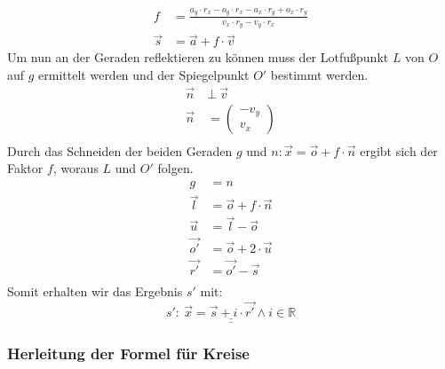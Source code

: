 \documentclass[reducespace,stylepage,semiarbeit]{spezidoc}
\begin{document}
\begin{equation*}
\begin{split}
f &= \frac{a_y \cdot r_x - o_y \cdot r_x - a_x \cdot r_y + o_x \cdot r_y}{v_x \cdot r_y - v_y \cdot r_x} \\
\vec{s} &= \vec{a} + f \cdot \vec{v}
\end{split}
\end{equation*}
Um nun an der Geraden reflektieren zu können muss der Lotfußpunkt $L$ von $O$ auf $g$ ermittelt werden und der Spiegelpunkt $O'$ bestimmt werden.
\begin{equation*}
\begin{split}
\vec{n}~ &\bot ~\vec{v} \\
\vec{n} &= \begin{pmatrix} -v_y \\ v_x \end{pmatrix} \\
\end{split}
\end{equation*}
Durch das Schneiden der beiden Geraden $g$ und $n: \vec{x} = \vec{o} + f \cdot \vec{n}$ ergibt sich der Faktor $f$, woraus $L$ und $O'$ folgen.
\begin{equation*}
\begin{split}
g &= n \\
\vec{l} &= \vec{o} + f \cdot \vec{n} \\
\vec{u} &= \vec{l} - \vec{o} \\
\vec{o'} &= \vec{o} + 2 \cdot \vec{u} \\
\vec{r'} &= \vec{o'} - \vec{s} \\
\end{split}
\end{equation*}
Somit erhalten wir das Ergebnis $s'$ mit:
\begin{equation*}
\underline{\underline{s':~ \vec{x} = \vec{s} + i \cdot \vec{r'} \wedge i \in \mathds{R}}}
\end{equation*}

\newpage
\subsubsection*{Herleitung der Formel für Kreise}
\end{document}

